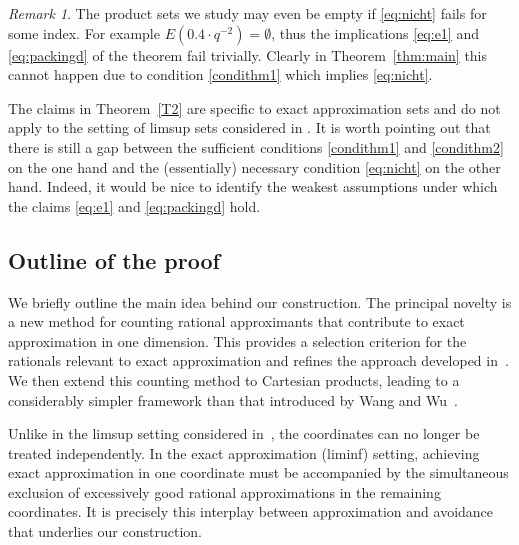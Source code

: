 \documentclass[11pt]{amsart}
\numberwithin{equation}{section}
\newcommand{\0}{\mathbf{0}}
\theoremstyle{remark}
\newtheorem{remark}{{Remark}}
\begin{document}
\begin{remark}
    The product sets we study may even be empty if \eqref{eq:nicht} fails
    for some index.
    For example $E(0.4\cdot q^{-2})=\emptyset$, thus the implications \eqref{eq:e1} and \eqref{eq:packingd} of the theorem fail trivially.
    Clearly in Theorem~\ref{thm:main} this cannot happen
    due to condition \eqref{condithm1} which implies \eqref{eq:nicht}.
\end{remark}

   
    The claims in Theorem~\ref{T2} are specific to exact approximation sets and do not apply to the setting of limsup sets considered in \cite{WangWuTAMS}.
   It is worth pointing out that there is still
    a gap between the sufficient conditions \eqref{condithm1} and  \eqref{condithm2} on the one hand
    and the (essentially) necessary condition \eqref{eq:nicht} on the other hand.
    Indeed, it would be nice to identify the weakest assumptions under which the claims \eqref{eq:e1} and \eqref{eq:packingd} hold.  
   

\subsection{Outline of the proof}
We briefly outline the main idea behind our construction. The principal
novelty is a new method for counting rational approximants that contribute
to exact approximation in one dimension. This provides a selection
criterion for the rationals relevant to exact approximation and refines
the approach developed in~\cite[Section~2]{BandiGhoshNandi}. We then
extend this counting method to Cartesian products, leading to a
considerably simpler framework than that introduced by Wang and
Wu~\cite{WangWuTAMS}.

Unlike in the limsup setting considered
in~\cite{WangWuTAMS}, the coordinates can no longer be treated
independently. In the exact approximation (liminf) setting, achieving
exact approximation in one coordinate must be accompanied by the
simultaneous exclusion of excessively good rational approximations in the
remaining coordinates. It is precisely this interplay between
approximation and avoidance that underlies our construction.
\end{document}
